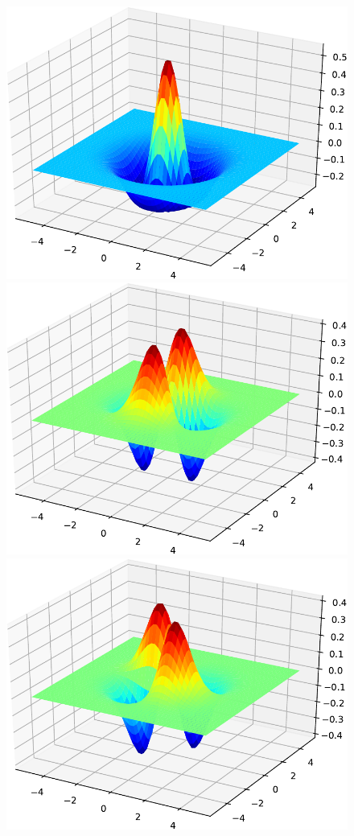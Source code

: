 \begin{figure}[H]
{\includegraphics[scale=0.3]{../codes/sch_2d/IMG_harmonic_psi_4.pdf}%
\includegraphics[scale=0.3]{../codes/sch_2d/IMG_harmonic_psi_5.pdf}%
\includegraphics[scale=0.3]{../codes/sch_2d/IMG_harmonic_psi_6.pdf}\\
}
\end{figure}
